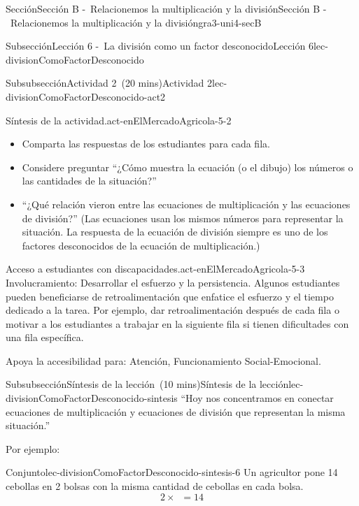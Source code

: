 \documentclass[oneside,10pt,]{article}
\begin{document}
\begin{sectionptx}{Sección}{Sección B -~Relacionemos la multiplicación y la división}{}{Sección B -~Relacionemos la multiplicación y la división}{}{}{gra3-uni4-secB}
\begin{subsectionptx}{Subsección}{Lección 6 -~La división como un factor desconocido}{}{Lección 6}{}{}{lec-divisionComoFactorDesconocido}
\begin{subsubsectionptx}{Subsubsección}{Actividad 2~(20 mins)}{}{Actividad 2}{}{}{lec-divisionComoFactorDesconocido-act2}
\begin{paragraphs}{Síntesis de la actividad.}{act-enElMercadoAgricola-5-2}%
%
\begin{itemize}[label=\textbullet]
\item{}Comparta las respuestas de los estudiantes para cada fila.%
\item{}Considere preguntar ``¿Cómo muestra la ecuación (o el dibujo) los números o las cantidades de la situación?''%
\item{}``¿Qué relación vieron entre las ecuaciones de multiplicación y las ecuaciones de división?'' (Las ecuaciones usan los mismos números para representar la situación. La respuesta de la ecuación de división siempre es uno de los factores desconocidos de la ecuación de multiplicación.)%
\end{itemize}
\end{paragraphs}%
\begin{paragraphs}{Acceso a estudiantes con discapacidades.}{act-enElMercadoAgricola-5-3}%
Involucramiento: Desarrollar el esfuerzo y la persistencia. Algunos estudiantes pueden beneficiarse de retroalimentación que enfatice el esfuerzo y el tiempo dedicado a la tarea. Por ejemplo, dar retroalimentación después de cada fila o motivar a los estudiantes a trabajar en la siguiente fila si tienen dificultades con una fila específica.%
\par
Apoya la accesibilidad para: Atención, Funcionamiento Social-Emocional.%
\end{paragraphs}%
\end{subsubsectionptx}
%
%
\typeout{************************************************}
\typeout{************************************************}
%
\begin{subsubsectionptx}{Subsubsección}{Síntesis de la lección~(10 mins)}{}{Síntesis de la lección}{}{}{lec-divisionComoFactorDesconocido-sintesis}
``Hoy nos concentramos en conectar ecuaciones de multiplicación y ecuaciones de división que representan la misma situación.''%
\par
Por ejemplo:%
\begin{assemblage}{Conjunto}{}{lec-divisionComoFactorDesconocido-sintesis-6}%
Un agricultor pone 14 cebollas en 2 bolsas con la misma cantidad de cebollas en cada bolsa.%
\begin{equation*}
\displaystyle 2 \times \boxed{\phantom{3}} = 14
\end{equation*}
%
\begin{equation*}

\end{equation*}
\end{assemblage}
\end{subsubsectionptx}
\end{subsectionptx}
\end{sectionptx}
\end{document}

